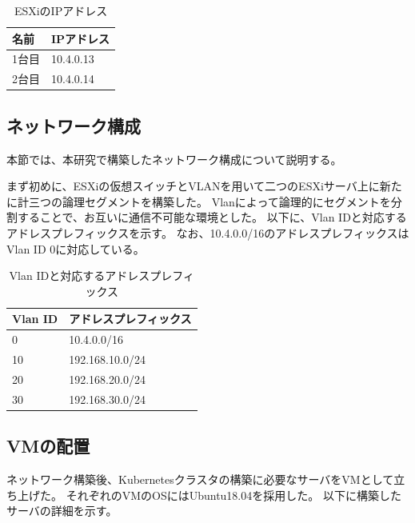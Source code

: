 \begin{table}[htb]
  \begin{center}
    \caption{ESXiのIPアドレス}
    \begin{tabular}{|l|l|} \hline
      名前 & IPアドレス \\ \hline
      1台目 & 10.4.0.13 \\ \hline
      2台目 & 10.4.0.14 \\ \hline
    \end{tabular}
  \end{center}
\end{table}

\subsection{ネットワーク構成}
\label{implementation:network-environment}

本節では、本研究で構築したネットワーク構成について説明する。

まず初めに、ESXiの仮想スイッチとVLANを用いて二つのESXiサーバ上に新たに計三つの論理セグメントを構築した。
Vlanによって論理的にセグメントを分割することで、お互いに通信不可能な環境とした。
以下に、Vlan IDと対応するアドレスプレフィックスを示す。
なお、10.4.0.0/16のアドレスプレフィックスはVlan ID 0に対応している。

\begin{table}[htb]
  \begin{center}
    \caption{Vlan IDと対応するアドレスプレフィックス}
    \begin{tabular}{|l|l|} \hline
      Vlan ID & アドレスプレフィックス \\ \hline
      0 & 10.4.0.0/16 \\ \hline
      10 & 192.168.10.0/24 \\ \hline
      20 & 192.168.20.0/24 \\ \hline
      30 & 192.168.30.0/24 \\ \hline
    \end{tabular}
  \end{center}
\end{table}

\subsection{VMの配置}

ネットワーク構築後、Kubernetesクラスタの構築に必要なサーバをVMとして立ち上げた。
それぞれのVMのOSにはUbuntu18.04を採用した。
以下に構築したサーバの詳細を示す。

